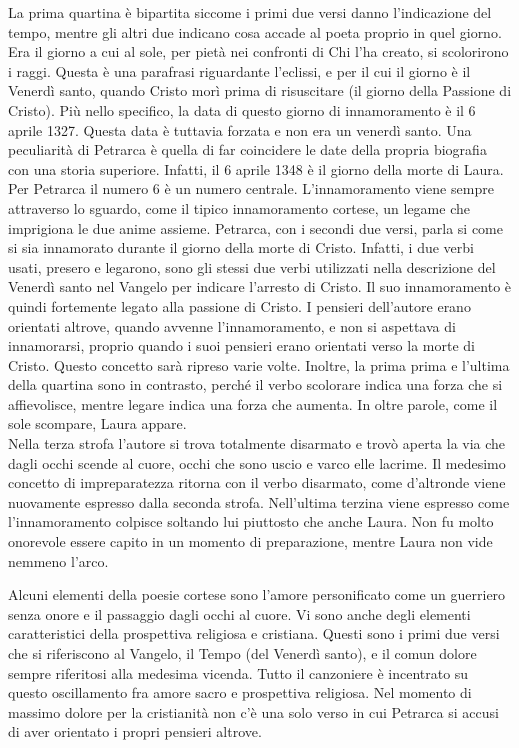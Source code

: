 \documentclass[a4paper]{article}
\begin{document}
La prima quartina è bipartita siccome i primi due versi danno l'indicazione del tempo,
mentre gli altri due indicano cosa accade al poeta proprio in quel giorno.
Era il giorno a cui al sole, per pietà nei confronti di Chi l'ha creato, si scolorirono i raggi.
Questa è una parafrasi riguardante l'eclissi, e per il cui il giorno è il Venerdì santo, quando
Cristo morì prima di risuscitare (il giorno della Passione di Cristo).
Più nello specifico, la data di questo giorno di innamoramento è il 6 aprile 1327.
Questa data è tuttavia forzata e non era un venerdì santo.
Una peculiarità di Petrarca è quella di far coincidere le date della propria biografia
con una storia superiore. Infatti, il 6 aprile 1348 è il giorno della morte di Laura.
Per Petrarca il numero 6 è un numero centrale.
L'innamoramento viene sempre attraverso lo sguardo, come il tipico innamoramento cortese,
un legame che imprigiona le due anime assieme.
Petrarca, con i secondi due versi, parla si come si sia innamorato durante il giorno della morte di Cristo.
Infatti, i due verbi usati, presero e legarono, sono gli stessi due verbi utilizzati nella descrizione
del Venerdì santo nel Vangelo per indicare l'arresto di Cristo.
Il suo innamoramento è quindi fortemente legato alla passione di Cristo.
I pensieri dell'autore erano orientati altrove, quando avvenne l'innamoramento, e non si aspettava
di innamorarsi, proprio quando i suoi pensieri erano orientati verso la morte di Cristo.
Questo concetto sarà ripreso varie volte.
Inoltre, la prima prima e l'ultima della quartina sono in contrasto, perché il verbo scolorare
indica una forza che si affievolisce, mentre legare indica una forza che aumenta.
In oltre parole, come il sole scompare, Laura appare. \\
Nella terza strofa l'autore si trova totalmente disarmato e trovò aperta la via
che dagli occhi scende al cuore, occhi che sono uscio e varco elle lacrime.
Il medesimo concetto di impreparatezza ritorna con il verbo disarmato, come d'altronde viene
nuovamente espresso dalla seconda strofa.
Nell'ultima terzina viene espresso come
l'innamoramento colpisce soltando lui piuttosto che anche Laura.
Non fu molto onorevole essere capito in un momento di preparazione, mentre
Laura non vide nemmeno l'arco.

Alcuni elementi della poesie cortese sono l'amore personificato come un guerriero
senza onore e il passaggio dagli occhi al cuore.
Vi sono anche degli elementi caratteristici della prospettiva religiosa e cristiana.
Questi sono i primi due versi che si riferiscono al Vangelo, il Tempo (del Venerdì santo),
e il comun dolore sempre riferitosi alla medesima vicenda.
Tutto il canzoniere è incentrato su questo oscillamento fra amore sacro e prospettiva religiosa.
Nel momento di massimo dolore per la cristianità non c'è una solo verso in cui Petrarca si accusi di
aver orientato i propri pensieri altrove.
\end{document}
